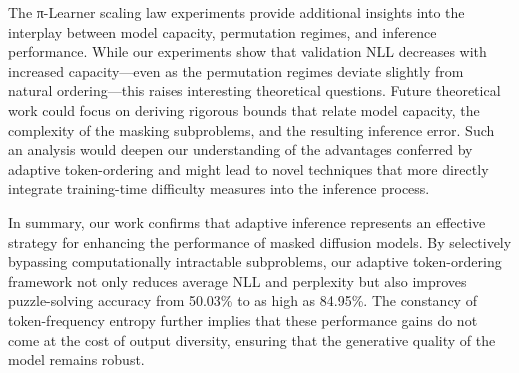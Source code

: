 \documentclass{article}
\begin{document}
The π-Learner scaling law experiments provide additional insights into the interplay between model capacity, permutation regimes, and inference performance. While our experiments show that validation NLL decreases with increased capacity—even as the permutation regimes deviate slightly from natural ordering—this raises interesting theoretical questions. Future theoretical work could focus on deriving rigorous bounds that relate model capacity, the complexity of the masking subproblems, and the resulting inference error. Such an analysis would deepen our understanding of the advantages conferred by adaptive token-ordering and might lead to novel techniques that more directly integrate training-time difficulty measures into the inference process.

In summary, our work confirms that adaptive inference represents an effective strategy for enhancing the performance of masked diffusion models. By selectively bypassing computationally intractable subproblems, our adaptive token-ordering framework not only reduces average NLL and perplexity but also improves puzzle-solving accuracy from 50.03\% to as high as 84.95\%. The constancy of token-frequency entropy further implies that these performance gains do not come at the cost of output diversity, ensuring that the generative quality of the model remains robust.
\end{document}

